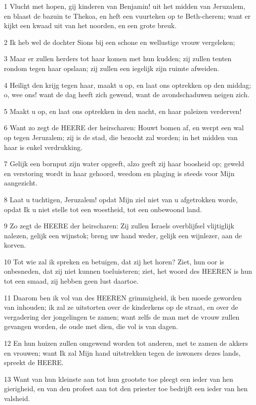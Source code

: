 \par 1 Vlucht met hopen, gij kinderen van Benjamin! uit het midden van Jeruzalem, en blaast de bazuin te Thekoa, en heft een vuurteken op te Beth-cherem; want er kijkt een kwaad uit van het noorden, en een grote breuk.
\par 2 Ik heb wel de dochter Sions bij een schone en wellustige vrouw vergeleken;
\par 3 Maar er zullen herders tot haar komen met hun kudden; zij zullen tenten rondom tegen haar opslaan; zij zullen een iegelijk zijn ruimte afweiden.
\par 4 Heiligt den krijg tegen haar, maakt u op, en laat ons optrekken op den middag; o, wee ons! want de dag heeft zich gewend, want de avondschaduwen neigen zich.
\par 5 Maakt u op, en laat ons optrekken in den nacht, en haar paleizen verderven!
\par 6 Want zo zegt de HEERE der heirscharen: Houwt bomen af, en werpt een wal op tegen Jeruzalem; zij is de stad, die bezocht zal worden; in het midden van haar is enkel verdrukking.
\par 7 Gelijk een bornput zijn water opgeeft, alzo geeft zij haar boosheid op; geweld en verstoring wordt in haar gehoord, weedom en plaging is steeds voor Mijn aangezicht.
\par 8 Laat u tuchtigen, Jeruzalem! opdat Mijn ziel niet van u afgetrokken worde, opdat Ik u niet stelle tot een woestheid, tot een onbewoond land.
\par 9 Zo zegt de HEERE der heirscharen: Zij zullen Israels overblijfsel vlijtiglijk nalezen, gelijk een wijnstok; breng uw hand weder, gelijk een wijnlezer, aan de korven.
\par 10 Tot wie zal ik spreken en betuigen, dat zij het horen? Ziet, hun oor is onbesneden, dat zij niet kunnen toeluisteren; ziet, het woord des HEEREN is hun tot een smaad, zij hebben geen lust daartoe.
\par 11 Daarom ben ik vol van des HEEREN grimmigheid, ik ben moede geworden van inhouden; ik zal ze uitstorten over de kinderkens op de straat, en over de vergadering der jongelingen te zamen; want zelfs de man met de vrouw zullen gevangen worden, de oude met dien, die vol is van dagen.
\par 12 En hun huizen zullen omgewend worden tot anderen, met te zamen de akkers en vrouwen; want Ik zal Mijn hand uitstrekken tegen de inwoners dezes lands, spreekt de HEERE.
\par 13 Want van hun kleinste aan tot hun grootste toe pleegt een ieder van hen gierigheid, en van den profeet aan tot den priester toe bedrijft een ieder van hen valsheid.
